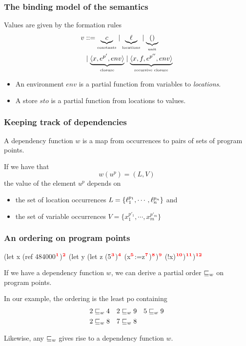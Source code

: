 \documentclass{beamer}
\begin{document}
\begin{frame}
  \frametitle{The binding model of the semantics}

  Values are given by the formation rules
%
  \begin{align*}
    v & ::= \underbrace{c}_{\text{\tiny{constants}}} \mid \underbrace{\ell}_{\text{\tiny{locations}}} \mid
        \underbrace{()}_{\text{\tiny{unit}}} \\
    & \mid  \underbrace{\langle x,e^{p'},env\rangle}_{\text{\tiny{closure}}} \mid
      \underbrace{\langle x,f,e^{p''},env\rangle}_{\text{\tiny{recursive closure}}}
   \end{align*}

   \begin{itemize}
   \item An environment $env$ is a partial function from
variables to \emph{locations}.
\item A store $sto$ is a partial function from locations to values.
   \end{itemize}

\end{frame}
\begin{frame} \frametitle{Keeping track of dependencies}

  A dependency function $w$ is a map from occurrences to pairs of sets
  of program points.
  
  If we have that
\[ w (u^p)=(L,V) \]
%
the value of the element $u^p$ depends on
\begin{itemize}
\item the set of location occurrences
  $L=\{\ell_1^{p_1},\cdots,\ell_n^{p_n}\}$ and
\item the set of variable occurrences $V =\{x_1^{p'_1},\cdots,x_m^{p'_m}\}$

\end{itemize}

\end{frame}

\begin{frame}[fragile]
  \frametitle{An ordering on program points}

   \begin{rescript}
   (let x (ref 484000$\mathbf{\textcolor{red}{^{1}}}$)$\mathbf{\textcolor{red}{^{2}}}$
     (let y (let z (5$\mathbf{\textcolor{red}{^{3}}}$)$\mathbf{\textcolor{red}{^{4}}}$
        (x$\mathbf{\textcolor{red}{^{5}}}$:=z$\mathbf{\textcolor{red}{^{7}}}$)$\mathbf{\textcolor{red}{^{8}}}$)$\mathbf{\textcolor{red}{^{9}}}$ (!x)$\mathbf{\textcolor{red}{^{10}}}$)$\mathbf{\textcolor{red}{^{11}}}$)$\mathbf{\textcolor{red}{^{12}}}$
\end{rescript}

      If we have a dependency function $w$, we can derive a partial order $\sqsubseteq_w$ on
      program points.

      In our example, the ordering is the least po containing
%
      \begin{align*}
        2 \sqsubseteq_w 4 && 2 \sqsubseteq_w 9 && 5 \sqsubseteq_w 9 \\
        2 \sqsubseteq_w 8 && 7 \sqsubseteq_w 8
      \end{align*}

      Likewise, any $\sqsubseteq_w$ gives rise to a dependency function $w$.
\end{frame}
\end{document}

